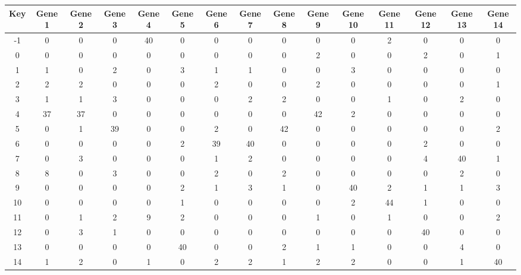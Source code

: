 \begin{tabular}{|c|c|c|c|c|c|c|c|c|c|c|c|c|c|c|}
\hline
Key & Gene 1 & Gene 2 & Gene 3 & Gene 4 & Gene 5 & Gene 6 & Gene 7 & Gene 8 & Gene 9 & Gene 10 & Gene 11 & Gene 12 & Gene 13 & Gene 14 \\
\hline
-1 & 0 & 0 & 0 & 40 & 0 & 0 & 0 & 0 & 0 & 0 & 2 & 0 & 0 & 0 \\
0 & 0 & 0 & 0 & 0 & 0 & 0 & 0 & 0 & 2 & 0 & 0 & 2 & 0 & 1 \\
1 & 1 & 0 & 2 & 0 & 3 & 1 & 1 & 0 & 0 & 3 & 0 & 0 & 0 & 0 \\
2 & 2 & 2 & 0 & 0 & 0 & 2 & 0 & 0 & 2 & 0 & 0 & 0 & 0 & 1 \\
3 & 1 & 1 & 3 & 0 & 0 & 0 & 2 & 2 & 0 & 0 & 1 & 0 & 2 & 0 \\
4 & 37 & 37 & 0 & 0 & 0 & 0 & 0 & 0 & 42 & 2 & 0 & 0 & 0 & 0 \\
5 & 0 & 1 & 39 & 0 & 0 & 2 & 0 & 42 & 0 & 0 & 0 & 0 & 0 & 2 \\
6 & 0 & 0 & 0 & 0 & 2 & 39 & 40 & 0 & 0 & 0 & 0 & 2 & 0 & 0 \\
7 & 0 & 3 & 0 & 0 & 0 & 1 & 2 & 0 & 0 & 0 & 0 & 4 & 40 & 1 \\
8 & 8 & 0 & 3 & 0 & 0 & 2 & 0 & 2 & 0 & 0 & 0 & 0 & 2 & 0 \\
9 & 0 & 0 & 0 & 0 & 2 & 1 & 3 & 1 & 0 & 40 & 2 & 1 & 1 & 3 \\
10 & 0 & 0 & 0 & 0 & 1 & 0 & 0 & 0 & 0 & 2 & 44 & 1 & 0 & 0 \\
11 & 0 & 1 & 2 & 9 & 2 & 0 & 0 & 0 & 1 & 0 & 1 & 0 & 0 & 2 \\
12 & 0 & 3 & 1 & 0 & 0 & 0 & 0 & 0 & 0 & 0 & 0 & 40 & 0 & 0 \\
13 & 0 & 0 & 0 & 0 & 40 & 0 & 0 & 2 & 1 & 1 & 0 & 0 & 4 & 0 \\
14 & 1 & 2 & 0 & 1 & 0 & 2 & 2 & 1 & 2 & 2 & 0 & 0 & 1 & 40 \\
\hline
\end{tabular}